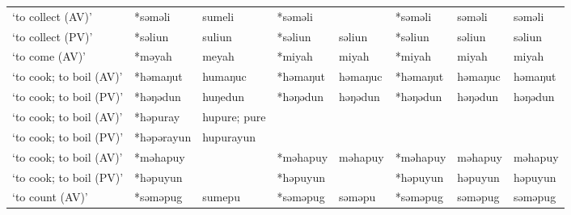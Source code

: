 \begin{landscape}
\begin{longtable}[c]{@{}p{3cm}<{\raggedright}p{2.75cm}<{\raggedright}p{2.75cm}<{\raggedright}p{2.75cm}<{\raggedright}p{2.75cm}<{\raggedright}p{2.75cm}<{\raggedright}p{2.75cm}<{\raggedright}p{2.75cm}<{\raggedright}@{}}
`to collect (AV)'                                    & *səməli            & sumeli                         & *səməli            &                            & *səməli          & səməli                   & səməli                            \\
`to collect (PV)'                                    & *səliun            & suliun                         & *səliun            & səliun                     & *səliun          & səliun                   & səliun                            \\
`to come (AV)'                                       & *məyah             & meyah                          & *miyah             & miyah                      & *miyah           & miyah                    & miyah                             \\
`to cook; to boil (AV)'                              & *həmaŋut           & humaŋuc                        & *həmaŋut           & həmaŋuc                    & *həmaŋut         & həmaŋuc                  & həmaŋut                           \\
`to cook; to boil (PV)'                              & *həŋədun           & huŋedun                        & *həŋədun           & həŋədun                    & *həŋədun         & həŋədun                  & həŋədun                           \\
`to cook; to boil (AV)'                              & *həpuray           & hupure; pure                   &                    &                            &                  &                          &                                   \\
`to cook; to boil (PV)'                              & *həpərayun         & hupurayun                      &                    &                            &                  &                          &                                   \\
`to cook; to boil (AV)'                              & *məhapuy           &                                & *məhapuy           & məhapuy                    & *məhapuy         & məhapuy                  & məhapuy                           \\
`to cook; to boil (PV)'                              & *həpuyun           &                                & *həpuyun           &                            & *həpuyun         & həpuyun                  & həpuyun                           \\
`to count (AV)'                                      & *səməpug           & sumepu                         & *səməpug           & səməpu                     & *səməpug         & səməpug                  & səməpug                           \\

\end{longtable}
\end{landscape}
